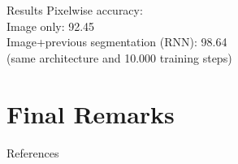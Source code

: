 \begin{frame}{Results}
Pixelwise accuracy:\\
Image only: 92.45 \\
Image+previous segmentation (RNN): 98.64 \\
(same architecture and 10.000 training steps)
\end{frame}

\begin{frame}{}
\end{frame}

\begin{frame}{}
\end{frame}

\section*{Final Remarks}
\begin{frame}{References}
\nocite{GoBeCo16}

\tiny

\end{frame}


